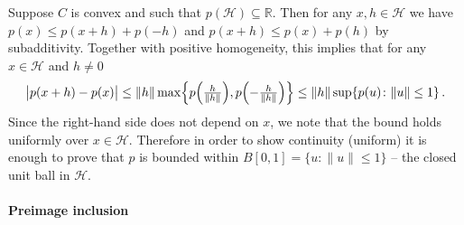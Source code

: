 \documentclass[a4paper]{article}
\newcommand{\Hcal}{\mathcal{H}}
\newcommand{\real}{\mathbb{R}}
\begin{document}
Suppose $C$ is convex and such that $p(\Hcal)\subseteq \real$. Then for any $x, h
\in \Hcal$ we have $p(x) \leq p(x+h) + p(-h)$ and $p(x + h) \leq p(x) + p(h)$ by
subadditivity. Together with positive homogeneity, this implies that for any $x \in
\Hcal$ and $h\neq 0$
\begin{equation*}
  \bigl\lvert p(x + h) - p(x) \bigr\rvert
    \leq \| h \| \max\Bigl\{
        p\Bigl(\tfrac{h}{\|h\|}\Bigr),
        p\Bigl(- \tfrac{h}{\|h\|}\Bigr)
      \Bigr\}
    \leq \| h \| \sup \{p(u)\colon \|u\|\leq 1\}
    \,.
\end{equation*}
Since the right-hand side does not depend on $x$, we note that the bound holds
uniformly over $x \in \Hcal$. Therefore in order to show continuity (uniform) it
is enough to prove that $p$ is bounded within $B[0, 1] = \{u\colon \|u\| \leq 1\}$
-- the closed unit ball in $\Hcal$.


\paragraph{Preimage inclusion} %
\label{par:preimage_inclusion}
\end{document}
